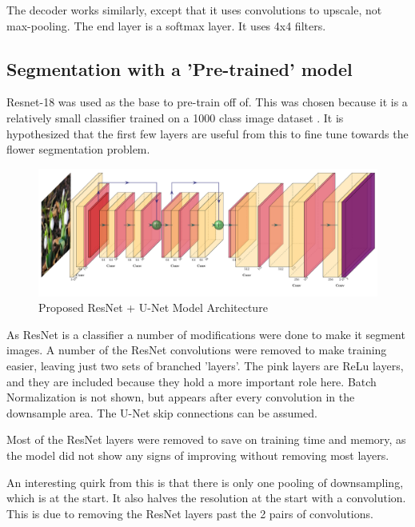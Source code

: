 \documentclass{article}
\begin{document}
The decoder works similarly, except that it uses convolutions to upscale, not max-pooling. The end layer is a softmax layer. It uses 4x4 filters.

\subsection{Segmentation with a 'Pre-trained' model}

Resnet-18 \autocite{resnet18} was used as the base to pre-train off of. This was chosen because it is a relatively small classifier trained on a 1000 class image dataset \autocite{heDeepResidualLearning2016}. It is hypothesized that the first few layers are useful from this to fine tune towards the flower segmentation problem. 

\begin{figure}[H]
    \centering
    \includegraphics[width=\linewidth]{resnetUnet.pdf}
    \caption{Proposed ResNet + U-Net Model Architecture}
\end{figure}

As ResNet is a classifier a number of modifications were done to make it segment images. A number of the ResNet convolutions were removed to make training easier, leaving just two sets of branched 'layers'. The pink layers are ReLu layers, and they are included because they hold a more important role here. Batch Normalization is not shown, but appears after every convolution in the downsample area. The U-Net skip connections can be assumed.

Most of the ResNet layers were removed to save on training time and memory, as the model did not show any signs of improving without removing most layers.

An interesting quirk from this is that there is only one pooling of downsampling, which is at the start. It also halves the resolution at the start with a convolution. This is due to removing the ResNet layers past the 2 pairs of convolutions.
\end{document}
